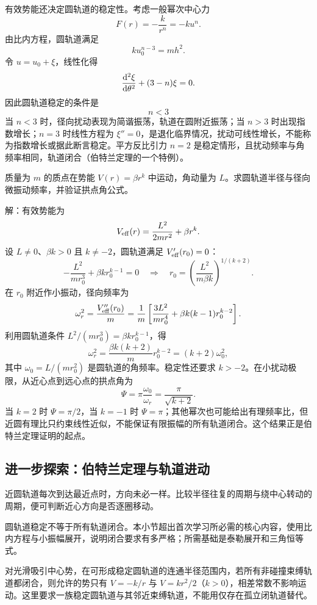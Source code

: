 有效势能还决定圆轨道的稳定性。考虑一般幂次中心力
\begin{equation}
F(r)=-\frac{k}{r^n}=-ku^n .
\end{equation}
由比内方程，圆轨道满足
\begin{equation}
ku_0^{n-3}=mh^2 .
\end{equation}
令 $u=u_0+\xi$，线性化得
\begin{equation}
\dvv[2]{\xi}{\theta}+(3-n)\xi=0 .
\label{eq:stability-perturb}
\end{equation}
因此圆轨道稳定的条件是
\begin{equation}
\boxed{\;n<3\;}
\label{eq:stability-condition}
\end{equation}
当 $n<3$ 时，径向扰动表现为简谐振荡，轨道在圆附近振荡；当 $n>3$ 时出现指数增长；$n=3$ 时线性方程为 $\xi''=0$，是退化临界情况，扰动可线性增长，不能称为指数增长或据此断言稳定。平方反比引力 $n=2$ 是稳定情形，且扰动频率与角频率相同，轨道闭合（伯特兰定理的一个特例）。


\begin{example}[幂次势的圆轨道与径向频率]
质量为 $m$ 的质点在势能 $V(r)=\beta r^k$ 中运动，角动量为 $L$。求圆轨道半径与径向微振动频率，并验证拱点角公式。

解：有效势能为
\[
V_{\rm eff}(r)=\frac{L^2}{2mr^2}+\beta r^k .
\]
设 $L\ne0$、$\beta k>0$ 且 $k\ne-2$，圆轨道满足 $V_{\rm eff}'(r_0)=0$：
\[
-\frac{L^2}{mr_0^3}+\beta k r_0^{k-1}=0
\quad\Longrightarrow\quad
r_0=\left(\frac{L^2}{m\beta k}\right)^{1/(k+2)} .
\]
在 $r_0$ 附近作小振动，径向频率为
\[
\omega_r^2=\frac{V_{\rm eff}''(r_0)}{m}
=\frac{1}{m}\left[\frac{3L^2}{mr_0^4}+\beta k(k-1)r_0^{k-2}\right].
\]
利用圆轨道条件 $L^2/(mr_0^3)=\beta k r_0^{k-1}$，得
\[
\omega_r^2=\frac{\beta k(k+2)}{m}r_0^{k-2}
=(k+2)\omega_0^2,
\]
其中 $\omega_0=L/(mr_0^2)$ 是圆轨道的角频率。稳定性还要求 $k>-2$。在小扰动极限，从近心点到远心点的拱点角为
\[
\Psi=\pi\frac{\omega_0}{\omega_r}
=\frac{\pi}{\sqrt{k+2}} .
\]
当 $k=2$ 时 $\Psi=\pi/2$，当 $k=-1$ 时 $\Psi=\pi$；其他幂次也可能给出有理频率比，但近圆有理比只约束线性近似，不能保证有限振幅的所有轨道闭合。这个结果正是伯特兰定理证明的起点。
\end{example}

\subsection{进一步探索：伯特兰定理与轨道进动}
近圆轨道每次到达最近点时，方向未必一样。比较半径往复的周期与绕中心转动的周期，便可判断近心方向是否逐圈移动。

圆轨道稳定不等于所有轨道闭合。本小节超出首次学习所必需的核心内容，使用比内方程与小振幅展开，说明闭合要求有多严格；所需基础是泰勒展开和三角恒等式。
\begin{theorem}[伯特兰定理的通常正则情形]
对光滑吸引中心势，在可形成稳定圆轨道的连通半径范围内，若所有非碰撞束缚轨道都闭合，则允许的势只有 $V=-k/r$ 与 $V=kr^2/2$（$k>0$），相差常数不影响运动。这里要求一族稳定圆轨道与其邻近束缚轨道，不能用仅存在孤立闭轨道替代。
\end{theorem}

